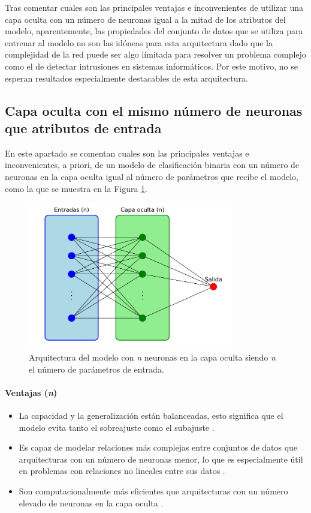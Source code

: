 Tras comentar cuales son las principales ventajas e inconvenientes de utilizar una capa oculta con un número de neuronas igual a la mitad de los atributos del modelo, aparentemente, las propiedades del conjunto de datos que se utiliza para entrenar al modelo no son las idóneas para esta arquitectura dado que la complejidad de la red puede ser algo límitada para resolver un problema complejo como el de detectar intrusiones en sistemas informáticos. Por este motivo, no se esperan resultados especialmente destacables de esta arquitectura.

\subsection{Capa oculta con el mismo número de neuronas que atributos de entrada}\label{sec:VIBIN49}
En este apartado se comentan cuales son las principales ventajas e inconvenientes, a priori, de un modelo de clasificación binaria con un número de neuronas en la capa oculta igual al número de parámetros que recibe el modelo, como la que se muestra en la Figura \ref{fig:arqnBIN}.

\begin{figure}[H]
    \centering
    \includegraphics[width=0.8\textwidth]{./img/modelo/arquitecturas/arqnBIN.pdf}
    \caption{Arquitectura del modelo con \textit{n} neuronas en la capa oculta siendo \textit{n} el número de parámetros de entrada.}
    \label{fig:arqnBIN}
\end{figure}

\paragraph{Ventajas (\textit{n})}
\begin{itemize}
	\item La capacidad y la generalización están balanceadas, esto significa que el modelo evita tanto el sobreajuste como el subajuste \cite{zhang2016understanding}.
	\item Es capaz de modelar relaciones más complejas entre conjuntos de datos que arquitecturas con un número de neuronas menor, lo que es especialmente útil en problemas con relaciones no lineales entre sus datos \cite{goodfellow2016deep}.
	\item Son computacionalmente más eficientes que arquitecturas con un número elevado de neuronas en la capa oculta \cite{bengio2006greedy}. 
\end{itemize}

